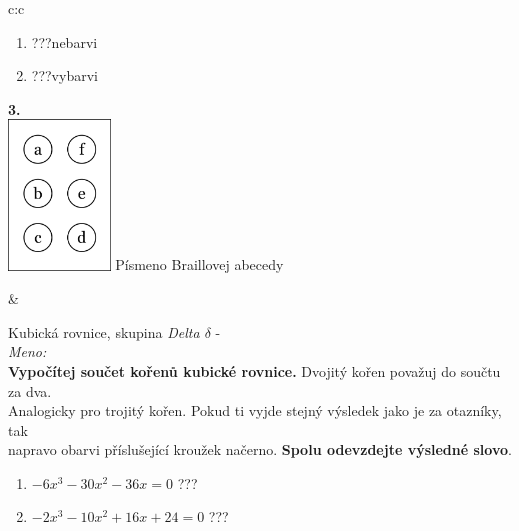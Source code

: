 \documentclass[10pt]{report}
\begin{document}
\begin{tabular}{c:c}
\begin{minipage}[c][99mm][t]{0.49\linewidth}
\begin{center}
\begin{minipage}{0.77\linewidth}
\begin{center}
\begin{varwidth}{\textwidth}
\begin{enumerate}
\item \quad \dotfill\; ???\;\dotfill \quad nebarvi
\item \quad \dotfill\; ???\;\dotfill \quad vybarvi
\end{enumerate}
\end{varwidth}
\end{center}
\end{minipage}
\begin{minipage}{0.20\linewidth}
\begin{center}
{\Huge\bfseries 3.} \\[2mm]
\includegraphics[height=40mm]{../images/braille.png}
{\small Písmeno Braillovej abecedy}
\end{center}
\end{minipage}
\end{center}
\end{minipage}
&
\begin{minipage}[c][99mm][t]{0.49\linewidth}
\begin{center}
\vspace{7mm}
{\huge Kubická rovnice, skupina \textit{Delta $\delta$} -}\\[4.5mm]
\textit{Meno:}\phantom{xxxxxxxxxxxxxxxxxxxxxxxxxxxxxxxxxxxxxxxxxxxxxxxxxxxxxxxxxxxxxxxxx}\\[3.5mm]
\textbf{Vypočítej součet kořenů kubické rovnice.} Dvojitý kořen považuj do součtu za dva.\\Analogicky pro trojitý kořen. Pokud ti vyjde stejný výsledek jako je za otazníky, tak\\napravo obarvi příslušející kroužek načerno. \textbf{Spolu odevzdejte výsledné slovo}.\\[3mm]
\begin{minipage}{0.77\linewidth}
\begin{center}
\begin{varwidth}{\textwidth}
\begin{enumerate}
\large
\item $-6x^3-30x^2-36x=0$\quad \dotfill\; ???\;\dotfill {}
\item $-2x^3-10x^2+16x+24=0$\quad \dotfill\; ???\;\dotfill {}

\end{enumerate}
\end{varwidth}
\end{center}
\end{minipage}
\end{center}
\end{minipage}
\end{tabular}
\end{document}
